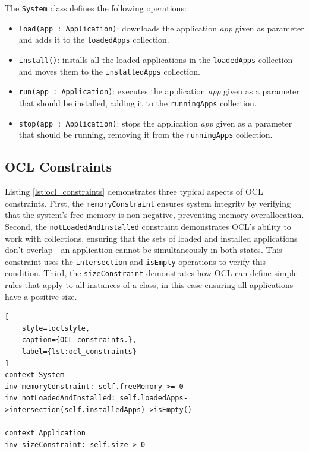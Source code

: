 The \texttt{System} class defines the following operations:
\begin{itemize}
    \setlength{\itemsep}{0pt}
    \setlength{\parskip}{0pt}
    \setlength{\parsep}{0pt}
    \item \texttt{load(app : Application)}: downloads the application \textit{app} given as parameter and adds it to the \texttt{loadedApps} collection.
    \item \texttt{install()}: installs all the loaded applications in the \texttt{loadedApps} collection and moves them to the \texttt{installedApps} collection.
    \item \texttt{run(app : Application)}: executes the application \textit{app} given as a parameter that should be installed, adding it to the \texttt{runningApps} collection.
    \item \texttt{stop(app : Application)}: stops the application \textit{app} given as a parameter that should be running, removing it from the \texttt{runningApps} collection.
\end{itemize}


\subsection{OCL Constraints}
\hspace{1cm} Listing \ref{lst:ocl_constraints} demonstrates three typical aspects of OCL constraints. 
First, the \texttt{memoryConstraint} ensures system integrity by verifying that the 
system's free memory is non-negative, preventing memory overallocation. 
Second, the \texttt{notLoadedAndInstalled} constraint demonstrates OCL's ability to work with 
collections, ensuring that the sets of loaded and installed applications don't overlap - 
an application cannot be simultaneously in both states. This constraint uses the 
\texttt{intersection} and \texttt{isEmpty} operations to verify this condition.
Third, the \texttt{sizeConstraint} demonstrates how OCL can define 
simple rules that apply to all instances of a class, in this case ensuring all 
applications have a positive size.

\begin{lstlisting}[
    style=toclstyle, 
    caption={OCL constraints.}, 
    label={lst:ocl_constraints}
]
context System
inv memoryConstraint: self.freeMemory >= 0
inv notLoadedAndInstalled: self.loadedApps->intersection(self.installedApps)->isEmpty()

context Application
inv sizeConstraint: self.size > 0
\end{lstlisting}

